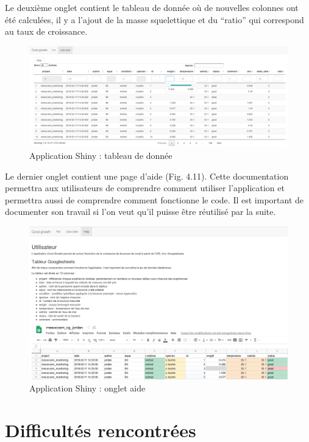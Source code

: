\documentclass[]{report}
\begin{document}
Le deuxième onglet contient le tableau de donnée où de nouvelles
colonnes ont été calculées, il y a l'ajout de la masse squelettique et
du ``ratio'' qui correspond au taux de croissance.

\begin{figure}[h!]
\includegraphics[]{../image/notebook-table1.png}
\caption{Application Shiny : tableau de donnée}
\end{figure}

Le dernier onglet contient une page d'aide (Fig. 4.11). Cette
documentation permettra aux utilisateurs de comprendre comment utiliser
l'application et permettra aussi de comprendre comment fonctionne le
code. Il est important de documenter son travail si l'on veut qu'il
puisse être réutilisé par la suite.

\begin{figure}[h!]
\includegraphics[]{../image/aide.PNG}
\caption{Application Shiny : onglet aide}
\end{figure}

\null
\newpage

\section{Difficultés rencontrées}\label{difficultes-rencontrees}
\end{document}
